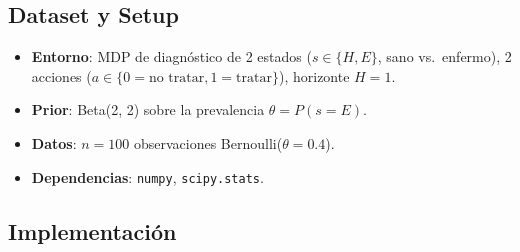 \subsection*{Dataset y Setup}

\begin{itemize}
  \item \textbf{Entorno}: MDP de diagnóstico de 2 estados ($s \in \{H, E\}$,
    sano vs.\ enfermo), 2 acciones ($a \in \{0=\text{no tratar},
    1=\text{tratar}\}$), horizonte $H=1$.
  \item \textbf{Prior}: Beta(2, 2) sobre la prevalencia $\theta = P(s=E)$.
  \item \textbf{Datos}: $n=100$ observaciones Bernoulli($\theta=0.4$).
  \item \textbf{Dependencias}: \texttt{numpy}, \texttt{scipy.stats}.
\end{itemize}

\subsection*{Implementación}

